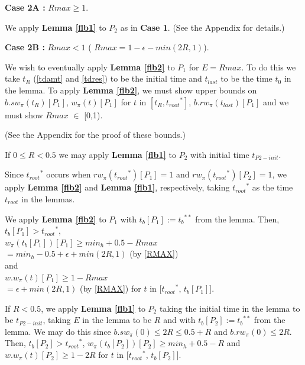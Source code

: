 \documentclass[oribib1]{llncs}
\newcommand{\troot}{t_{root}}
\newcommand{\troots}{{t_{root}}^*}
\newcommand{\tbss}{{t_b}^{**}}
\newcommand{\tbtwo}{t_b[{P_2}]}
\newcommand{\tblast}{t_b[{P_1}]}
\begin{document}
\noindent
{\bf Case 2A :} $Rmax \geq 1$.

\medskip

We apply {\bf Lemma \ref{flb1}} to $P_2$ as in {\bf Case 1}.
(See the Appendix for details.)
\bigskip

\noindent
{\bf Case 2B :} $Rmax < 1$ (%
$Rmax = 1 -\epsilon- min(2R,1)$).


We wish to eventually apply {\bf Lemma \ref{flb2}} to $P_1$ for $E = Rmax$. To do this we take $t_R$ (\ref{tdamt} and \ref{tdres}) to be the initial time and $t_{last}$ to be the time $t_0$ in the lemma. To apply  {\bf Lemma \ref{flb2}}, we must show upper bounds on $b.sw_{\pi}(t_R)[P_1]$, $w_{\pi}(t)[P_1]$ for $t$ in $[t_R, \troots]$, $b.rw_\pi(t_{last})[P_1]$ and we must show $Rmax$ $\in$ [0,1).

(See the Appendix for the proof of these bounds.)
\medskip



If $0 {\leq} R {<} 0.5$ we may apply {\bf Lemma \ref{flb1}} to $P_2$ with initial time $t_{P2-init}$.

Since $\troots$ occurs when $rw_\pi(\troots)[P_1]=1$ and $rw_\pi(\troots)[P_2]=1$, we apply {\bf Lemma \ref{flb2}} and {\bf Lemma \ref{flb1}}, 
respectively, taking $\troots$ as the time $\troot$ in the lemmas.

\medskip


We apply {\bf Lemma \ref{flb2}} to $P_1$ with $\tblast := \tbss$ from the lemma. Then, $\tblast > \troots$, \\
$w_{\pi}(\tblast)[P_1] \geq min_h + 0.5- Rmax$\\
$=  min_h -0.5 +\epsilon+ min(2R,1)$ (by \ref{RMAX})\\
and \\
$w.w_\pi(t)[P_1] \geq 1 - Rmax$\\
$= \epsilon+ min(2R,1)$ (by \ref{RMAX}) for $t$ in [$\troots$, $\tblast$].

\medskip

If $R< 0.5$, we apply {\bf Lemma \ref{flb1}} to $P_2$ taking the initial time in the lemma to be $t_{P2-init}$, taking $E$ in the lemma to be ${R}$ and with $\tbtwo := \tbss$ from the lemma. We may do this since $b.sw_{\pi}(0) \leq 2{R} \leq 0.5+{R}$ and $b.rw_{\pi}(0) \leq 2{R}$. Then, $\tbtwo > \troots$, $w_{\pi}(\tbtwo)[P_2] \geq min_h + 0.5 - {R}$ and $w.w_\pi(t)[P_2] \geq 1 - 2{R}$ for $t$ in [$\troots$, $\tbtwo$].
\end{document}
